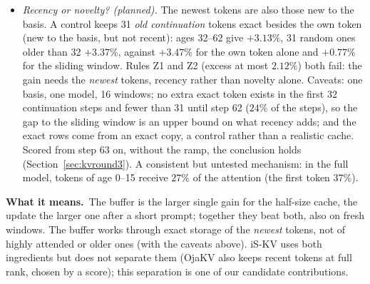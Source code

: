 \documentclass[10pt]{article}
\theoremstyle{plain}
\theoremstyle{definition}
\theoremstyle{remark}
\newcommand{\means}{\noindent\textbf{What it means.}\ }
\newcommand{\rl}[1]{\textsf{#1}}%
\begin{document}
\begin{itemize}[leftmargin=2em,itemsep=1pt]
\item \emph{Recency or novelty? (planned).} The newest tokens are also those new to the basis. A control keeps 31 \emph{old continuation} tokens exact besides the own token (new to the basis, but not recent): ages 32--62 give $+3.13\%$, 31 random ones older than 32 $+3.37\%$, against $+3.47\%$ for the own token alone and $+0.77\%$ for the sliding window. Rules \rl{Z1} and \rl{Z2} (excess at most $2.12\%$) both fail: the gain needs the \emph{newest} tokens, recency rather than novelty alone. Caveats: one basis, one model, 16 windows; no extra exact token exists in the first 32 continuation steps and fewer than 31 until step 62 ($24\%$ of the steps), so the gap to the sliding window is an upper bound on what recency adds; and the exact rows come from an exact copy, a control rather than a realistic cache. Scored from step 63 on, without the ramp, the conclusion holds (Section~\ref{sec:kvround3}). A consistent but untested mechanism: in the full model, tokens of age 0--15 receive $27\%$ of the attention (the first token $37\%$).
\end{itemize}

\means The buffer is the larger single gain for the half-size cache, the update the larger one after a short prompt; together they beat both, also on fresh windows. The buffer works through exact storage of the \emph{newest} tokens, not of highly attended or older ones (with the caveats above). iS-KV uses both ingredients but does not separate them (OjaKV also keeps recent tokens at full rank, chosen by a score); this separation is one of our candidate contributions.
\end{document}
